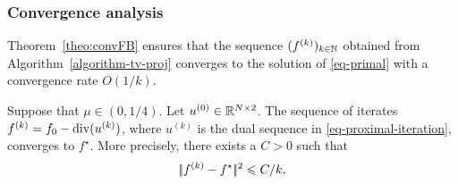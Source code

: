 \documentclass[11pt,nofonttune,a4paper]{IEEEtran}
\newcommand{\uk}{u^{(k)}}
\begin{document}
\subsubsection{Convergence analysis}
Theorem~\ref{theo:convFB} ensures that the sequence $(f^{(k)})_{k \in \mathbb{N}}$ obtained from Algorithm~\ref{algorithm-tv-proj} converges to the solution of \eqref{eq-primal} with a convergence rate $O(1/k)$.
\begin{thm}
\label{theo:convFB}
Suppose that $\mu \in (0,1/4)$. Let $u^{(0)} \in \mathbb{R}^{N \times 2}$. The sequence of iterates $f^{(k)} = f_0 - \diverg(\uk)$, where $\uk$ is the dual sequence in \eqref{eq-proximal-iteration}, converges to $f^\star$. More precisely, there exists a $C > 0$ such that
\[
|\!| f^{(k)}-f^\star |\!|^2 \leqslant C/k.
\]
\end{thm}
\end{document}
